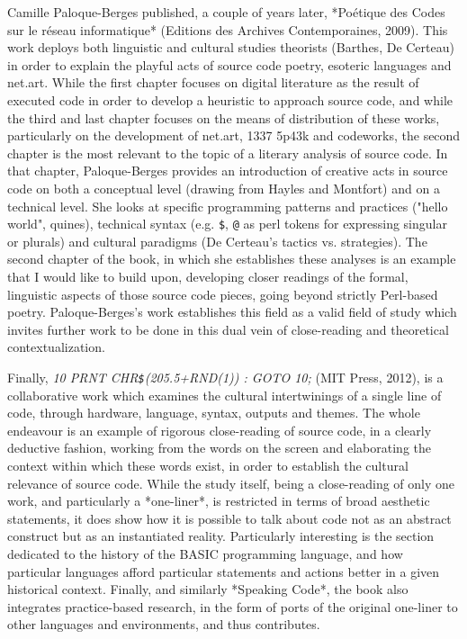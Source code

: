 Camille Paloque-Berges published, a couple of years later, *Poétique des Codes sur le réseau informatique* (Editions des Archives Contemporaines, 2009). This work deploys both linguistic and cultural studies theorists (Barthes, De Certeau) in order to explain the playful acts of source code poetry, esoteric languages and net.art. While the first chapter focuses on digital literature as the result of executed code in order to develop a heuristic to approach source code, and while the third and last chapter focuses on the means of distribution of these works, particularly on the development of net.art, 1337 5p43k and codeworks, the second chapter is the most relevant to the topic of a literary analysis of source code. In that chapter, Paloque-Berges provides an introduction of creative acts in source code on both a conceptual level (drawing from Hayles and Montfort) and on a technical level. She looks at specific programming patterns and practices ("hello world", quines), technical syntax (e.g. \lstinline{$}, \lstinline{@} as perl tokens for expressing singular or plurals) and cultural paradigms (De Certeau's tactics vs. strategies). The second chapter of the book, in which she establishes these analyses is an example that I would like to build upon, developing closer readings of the formal, linguistic aspects of those source code pieces, going beyond strictly Perl-based poetry. Paloque-Berges's work establishes this field as a valid field of study which invites further work to be done in this dual vein of close-reading and theoretical contextualization.

Finally, \emph{10 PRNT CHR\lstinline{$}(205.5+RND(1)) : GOTO 10;} (MIT Press, 2012), is a collaborative work which examines the cultural intertwinings of a single line of code, through hardware, language, syntax, outputs and themes. The whole endeavour is an example of rigorous close-reading of source code, in a clearly deductive fashion, working from the words on the screen and elaborating the context within which these words exist, in order to establish the cultural relevance of source code. While the study itself, being a close-reading of only one work, and particularly a *one-liner*, is restricted in terms of broad aesthetic statements, it does show how it is possible to talk about code not as an abstract construct but as an instantiated reality. Particularly interesting is the section dedicated to the history of the BASIC programming language, and how particular languages afford particular statements and actions better in a given historical context. Finally, and similarly *Speaking Code*, the book also integrates practice-based research, in the form of ports of the original one-liner to other languages and environments, and thus contributes.

